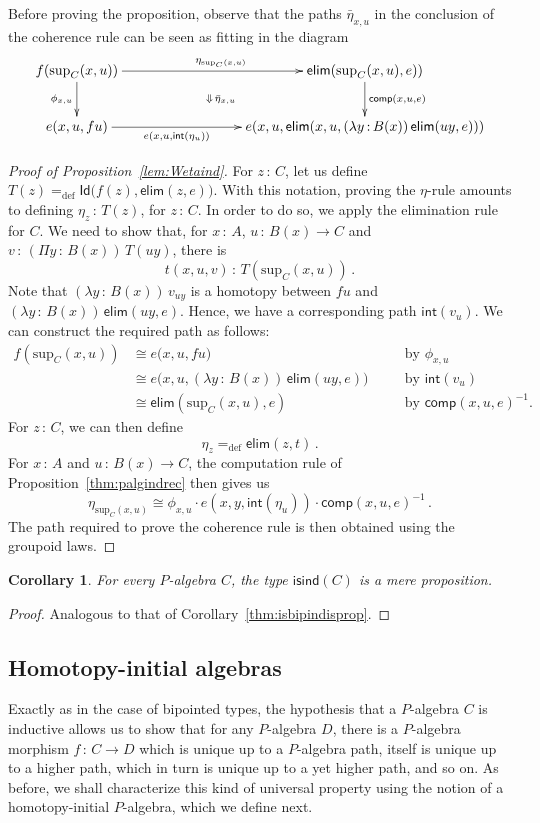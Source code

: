 \documentclass[10pt,a4paper,oneside,reqno]{amsart}
\numberwithin{equation}{section}
\theoremstyle{mythm}
\newtheorem{corollary}[theorem]{Corollary}
\theoremstyle{mydef}
\theoremstyle{myrmk}
\newcommand{\by}[1]{\quad&&\text{by {$#1$}}}
\newcommand{\defeq}{=_{\mathrm{def}}}
\newcommand{\co}{\,{:}\,}
\newcommand{\iso}{\cong}
\newcommand{\isind}{\mathsf{isind}}
\renewcommand{\int}{\mathsf{int}}
\newcommand{\Id}{\mathsf{Id}}
\newcommand{\elim}{\mathsf{elim}}
\newcommand{\comp}{\mathsf{comp}}
\renewcommand{\sup}{\mathrm{sup}}
\begin{document}
Before proving the proposition, observe that the paths $\bar{\eta}_{x,u}$ in the conclusion of the
coherence rule can be seen as fitting in the
diagram
\[
\xymatrix@C=3cm{
f(\sup_C(x,u)) \ar[r]^{\eta_{\sup_C(x,u)}} \ar[d]_{\phi_{x,u}} 
\ar@{}[dr]|{\Downarrow \, \bar{\eta}_{x,u}} & \elim(\sup_C(x,u), e))    \ar[d]^{\comp(x,u,e)} \\
 e(x,u,fu) \ar[r]_-{e(x,u, \int( \eta_u))} & e(x, u, \elim(x,u, (\lambda y \co B(x)) \, \elim(uy, e) )) }
\]



\begin{proof}[Proof of Proposition~\ref{lem:Wetaind}]  For $z \co C$, let us define $T(z) \defeq \Id \big(   f(z), \elim(z,e))$. With this notation, proving
 the $\eta$-rule amounts to defining $\eta_z \co T(z)$, for $z \co C$. In order to do so, we apply
the elimination rule for $C$. We need to show that, for $x \co A$, $u \co B(x) \to C$ and~$v \co 
(\Pi y \co B(x)) \, T(uy)$, there 
is 
\[
t(x,u,v) \co   T(\sup_C(x,u)) \, .
\]
Note that $(\lambda y \co B(x)) \, v_{uy}$ is a homotopy between $fu$ and $(\lambda y \co B(x)) \, \elim(uy, e)$.
Hence, we have a corresponding path $\int(v_u)$. We can construct the required path  as follows:
\begin{align*}
f(\sup_C(x,u)) &\iso e\big(x,u , f u \big)   \by{\phi_{x,u}}\\
	&\iso e\big(x,u, (\lambda y \co B(x) )\, \elim(u y ,e) \big) \by{\int( v_u)} \\
	& \iso \elim(\sup_C(x,u),e) \by{\comp(x,u,e)^{-1}}.
\end{align*}
For $z \co C$, we can then define
\[
\eta_z \defeq \elim(z,t) \, .
\] 
For $x \co A$ and $u \co B(x) \to C$, the  computation rule of Proposition~\ref{thm:palgindrec} then gives us
\[
 \eta_{\sup_C(x,u)} \iso \phi_{x,u} \cdot e(x,y,\int(  \eta_u ))  \cdot  \comp(x,u,e)^{-1} \, .
\]
The path required to prove  the coherence rule is then obtained using the groupoid laws.
\end{proof}


\begin{corollary} For every $P$-algebra $C$, the type $\isind(C)$ is a mere proposition.
\end{corollary}

\begin{proof} Analogous to that of Corollary~\ref{thm:isbipindisprop}.
\end{proof} 

\subsection*{Homotopy-initial algebras}
Exactly as in the case of bipointed types, the hypothesis that a $P$-algebra $C$ is inductive allows us to show that for any
$P$-algebra $D$, there is a $P$-algebra morphism $f \co C \to D$ which is unique up to a $P$-algebra path, itself is unique up 
to a higher path, which in turn is unique up to a yet higher path, and so on.  As before, we shall characterize this kind of universal property
using the notion of a homotopy-initial $P$-algebra, which we define next.
\end{document}
